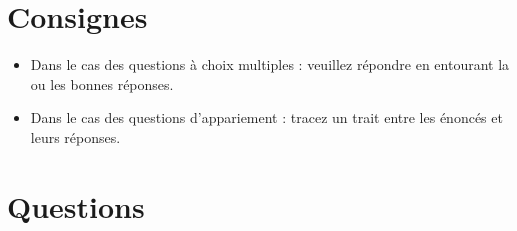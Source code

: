 \documentclass[11pt,a4paper,twoside]{article} %
\begin{document}
\maketitle
\thispagestyle{fancy}
\newpage

\section*{Consignes}
\begin{itemize}
    \item Dans le cas des questions à choix multiples : veuillez répondre en entourant la ou les bonnes réponses. 
    \item Dans le cas des questions d'appariement : tracez un trait entre les énoncés et leurs réponses.
\end{itemize}
\section*{Questions}
\end{document}
